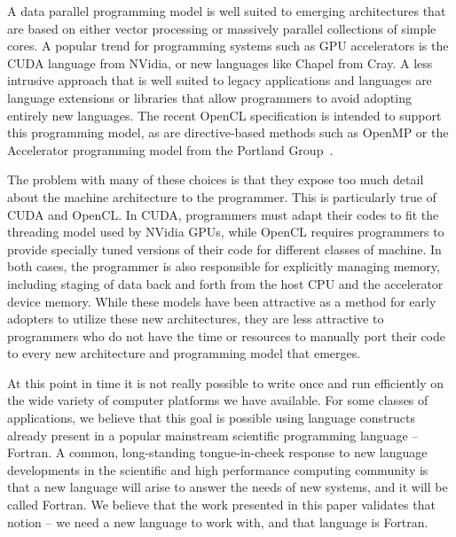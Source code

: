 
A data parallel programming model is well suited to emerging
architectures that are based on either vector processing or massively
parallel collections of simple cores.  A popular trend for programming
systems such as GPU accelerators is the CUDA language from NVidia, or
new languages like Chapel from Cray.  A less intrusive approach that
is well suited to legacy applications and languages are language
extensions or libraries that allow programmers to avoid adopting
entirely new languages.  The recent OpenCL specification is intended
to support this programming model, as are directive-based methods such
as OpenMP or the Accelerator programming model from the Portland
Group~\cite{pgi10accelerator}.

The problem with many of these choices is that they expose too much detail
about the machine architecture to the programmer.  
This is particularly true of CUDA and OpenCL.  In CUDA, programmers must
adapt their codes to fit the threading model used by NVidia GPUs, while
OpenCL requires programmers to provide specially tuned versions of
their code for different classes of machine.  In both cases, the programmer
is also responsible for explicitly managing memory, including staging of
data back and forth from the host CPU and the accelerator device memory.
While these models have been attractive as a method for early adopters
to utilize these new architectures, they are less attractive to programmers
who do not have the time or resources to manually port their code to every
new architecture and programming model that emerges.

At this point in time it is not really possible to write once and
run efficiently on the wide variety of computer platforms we have
available.  For some classes of applications, we believe that this goal
is possible using language constructs already present in a popular
mainstream scientific programming language -- Fortran.
A common, long-standing tongue-in-cheek response to new language developments
in the scientific and high performance computing community is that a new language
will arise to answer the needs of new systems, and it will be called Fortran.  
We believe that the work presented in this paper validates that notion -- 
we need a new language to work with, and that language is Fortran.

